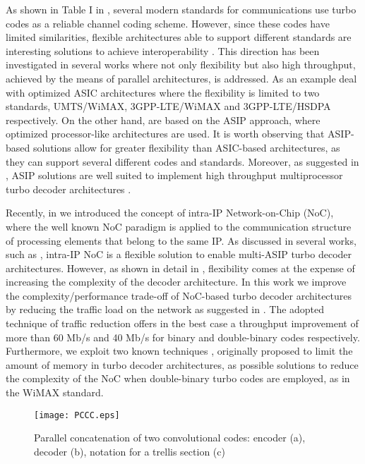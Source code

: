 \documentclass[10pt,twocolumn,journal]{IEEEtran}
\begin{document}
As shown in Table I in \cite{martina_MPMS11}, several modern standards for communications use turbo codes 
as a reliable channel coding scheme. However, since these codes have limited similarities, flexible architectures 
able to support different standards are interesting solutions to achieve interoperability \cite{polydoros_PIMRC08}. 
This direction has been investigated in several works \cite{wehn_TVLSI08, bougard_ICT08, martina_TCASII08, kim_CICC09, baghdadi_TVLSI09, baghdadi_soc10, wehn_ICCS10} 
where not only flexibility but also high throughput, achieved by the means of parallel architectures, is addressed.
As an example \cite{martina_TCASII08, kim_CICC09, wehn_ICCS10} deal with optimized ASIC architectures where the 
flexibility is limited to two standards, UMTS/WiMAX, 3GPP-LTE/WiMAX and 3GPP-LTE/HSDPA respectively. 
On the other hand, \cite{wehn_TVLSI08, bougard_ICT08, baghdadi_TVLSI09, baghdadi_soc10} are based on the ASIP approach, where 
optimized processor-like architectures are used. 
It is worth observing that ASIP-based solutions allow for greater flexibility than ASIC-based architectures, as they can support several different codes and 
standards. 
Moreover, as suggested in \cite{baghdadi_TVLSI09}, ASIP solutions are well suited to implement high throughput 
multiprocessor turbo decoder architectures \cite{martina_MPMS11}. 

Recently, in \cite{vacca_DSD09} we introduced the concept of intra-IP Network-on-Chip (NoC), where the well 
known NoC paradigm is applied to the communication structure of processing elements that belong to the same IP. 
As discussed in several works, such as 
\cite{wehn_iscas05, moussa_date07, moussa_iscas08, martina_TCASI10, martina_MPMS11}, intra-IP NoC is 
a flexible solution to enable multi-ASIP turbo decoder architectures. 
However, as shown in detail in \cite{martina_TCASI10, martina_MPMS11}, flexibility comes at the expense 
of increasing the complexity of the decoder architecture. In this work we improve 
the complexity/performance trade-off of NoC-based turbo decoder architectures by reducing the traffic load 
on the network as suggested in \cite{baghdadi_EL06}. 
The adopted technique of traffic reduction offers in the best case a throughput improvement 
of more than 60 Mb/s and 40 Mb/s for binary and double-binary codes respectively. 
Furthermore, we exploit two known techniques 
\cite{lee_VTC08,kim_TCASII09}, originally proposed to limit the amount of memory in turbo decoder architectures, 
as possible solutions to reduce the complexity of the NoC when double-binary turbo codes \cite{berrou_ITW01} are employed, 
as in the WiMAX standard. 
\begin{figure}[th!]
  \centering
  \texttt{[image: PCCC.eps]}
\caption{Parallel concatenation of two convolutional codes: encoder (a), decoder (b), notation for a trellis section (c)} 
\label{fig:turbo}
\end{figure}
\end{document}
